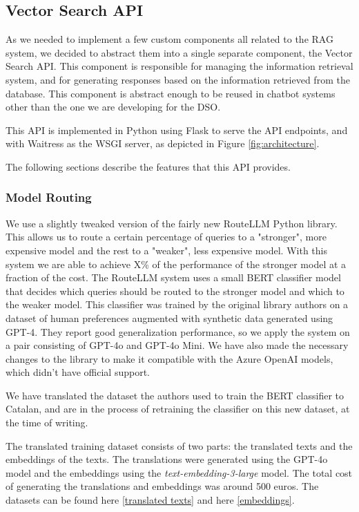 \documentclass[a4paper,12pt,twoside]{ThesisStyle}
\begin{document}
\subsection{Vector Search API}
\label{subsec:vector_search_api}

As we needed to implement a few custom components all related to the RAG system, we decided to abstract them into a single separate component, the Vector Search API. This component is responsible for managing the information retrieval system, and for generating responses based on the information retrieved from the database. This component is abstract enough to be reused in chatbot systems other than the one we are developing for the DSO.

This API is implemented in Python using Flask to serve the API endpoints, and with Waitress as the WSGI server, as depicted in Figure \ref{fig:architecture}.

The following sections describe the features that this API provides.

\subsubsection{Model Routing}

We use a slightly tweaked version of the fairly new RouteLLM Python library. This allows us to route a certain percentage of queries to a "stronger", more expensive model and the rest to a "weaker", less expensive model. With this system we are able to achieve X\% of the performance of the stronger model at a fraction of the cost. The RouteLLM system uses a small BERT classifier model that decides which queries should be routed to the stronger model and which to the weaker model. This classifier was trained by the original library authors on a dataset of human preferences augmented with synthetic data generated using GPT-4. They report good generalization performance, so we apply the system on a pair consisting of GPT-4o and GPT-4o Mini. We have also made the necessary changes to the library to make it compatible with the Azure OpenAI models, which didn't have official support.

We have translated the dataset the authors used to train the BERT classifier to Catalan, and are in the process of retraining the classifier on this new dataset, at the time of writing.

The translated training dataset consists of two parts: the translated texts and the embeddings of the texts. The translations were generated using the GPT-4o model and the embeddings using the \textit{text-embedding-3-large} model. The total cost of generating the translations and embeddings was around 500 euros. The datasets can be found here \href{https://huggingface.co/datasets/SupremeLobster/gpt4_judge_battles_catalan}{[translated texts]} and here \href{https://huggingface.co/datasets/SupremeLobster/gpt4_judge_battles_catalan_embeddings}{[embeddings]}.
\end{document}
